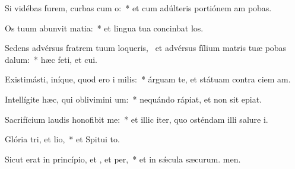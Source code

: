 \item Si vidébas furem, curbas cum o:~* et cum adúlteris portiónem am pobas.
\item Os tuum abunvit matia:~* et lingua tua concinbat los.
\item Sedens advérsus fratrem tuum loqueris,~\pscross{} et advérsus fílium matris tuæ pobas dalum:~* hæc feti, et cui.
\item Existimásti, iníque, quod ero i milis:~* árguam te, et státuam contra ciem am.
\item Intellígite hæc, qui oblivimini um:~* nequándo rápiat, et non sit  epiat.
\item Sacrifícium laudis honofibit me:~* et illic iter, quo osténdam illi salure i.
\item Glória tri, et lio,~* et Spitui to.
\item Sicut erat in princípio, et , et per,~* et in sǽcula sæcurum. men.
